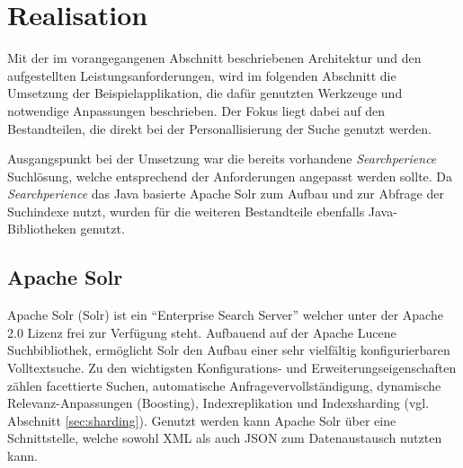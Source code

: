 \section{Realisation}\label{sec:realization}

Mit der im vorangegangenen Abschnitt beschriebenen Architektur und den aufgestellten Leistungsanforderungen, wird im folgenden Abschnitt die Umsetzung der Beispielapplikation, die dafür genutzten Werkzeuge und notwendige Anpassungen beschrieben. Der Fokus liegt dabei auf den Bestandteilen, die direkt bei der Personallisierung der Suche genutzt werden.

Ausgangspunkt bei der Umsetzung war die bereits vorhandene \textit{Searchperience} Suchlösung, welche entsprechend der Anforderungen angepasst werden sollte.
Da \textit{Searchperience} das Java basierte Apache Solr zum Aufbau und zur Abfrage der Suchindexe nutzt, wurden für die weiteren Bestandteile ebenfalls Java-Bibliotheken genutzt.

\subsection{Apache Solr}\label{sec:solr}

Apache Solr (Solr) ist ein ``Enterprise Search Server'' welcher unter der Apache 2.0 Lizenz frei zur Verfügung steht. Aufbauend auf der Apache Lucene Suchbibliothek, ermöglicht Solr den Aufbau einer sehr vielfältig konfigurierbaren Volltextsuche. Zu den wichtigsten Konfigurations- und Erweiterungseigenschaften zählen facettierte Suchen, automatische Anfragevervollständigung, dynamische Relevanz-Anpassungen (Boosting), Indexreplikation und Indexsharding (vgl. Abschnitt \ref{sec:sharding}). Genutzt werden kann Apache Solr über eine  Schnittstelle, welche sowohl XML als auch \gls{JSON} zum Datenaustausch nutzten kann.

